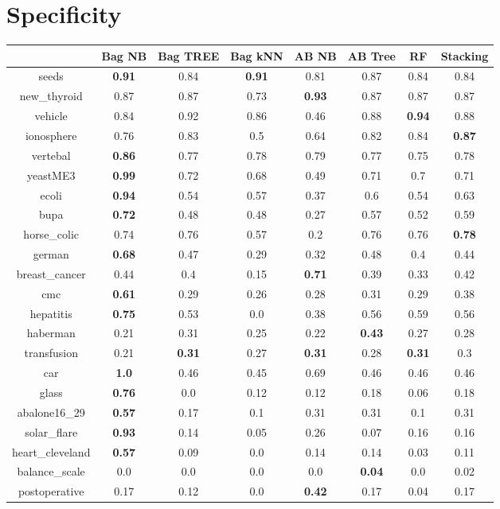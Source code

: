 \documentclass{article}%
\begin{document}
%
\section*{Specificity}%
\begin{tabular}{c|ccccccc}%
&Bag NB&Bag TREE&Bag kNN&AB NB&AB Tree&RF&Stacking\\%
\hline%
seeds&\textbf{0.91}&0.84&\textbf{0.91}&0.81&0.87&0.84&0.84\\%
new\_thyroid&0.87&0.87&0.73&\textbf{0.93}&0.87&0.87&0.87\\%
vehicle&0.84&0.92&0.86&0.46&0.88&\textbf{0.94}&0.88\\%
ionosphere&0.76&0.83&0.5&0.64&0.82&0.84&\textbf{0.87}\\%
vertebal&\textbf{0.86}&0.77&0.78&0.79&0.77&0.75&0.78\\%
yeastME3&\textbf{0.99}&0.72&0.68&0.49&0.71&0.7&0.71\\%
ecoli&\textbf{0.94}&0.54&0.57&0.37&0.6&0.54&0.63\\%
bupa&\textbf{0.72}&0.48&0.48&0.27&0.57&0.52&0.59\\%
horse\_colic&0.74&0.76&0.57&0.2&0.76&0.76&\textbf{0.78}\\%
german&\textbf{0.68}&0.47&0.29&0.32&0.48&0.4&0.44\\%
breast\_cancer&0.44&0.4&0.15&\textbf{0.71}&0.39&0.33&0.42\\%
cmc&\textbf{0.61}&0.29&0.26&0.28&0.31&0.29&0.38\\%
hepatitis&\textbf{0.75}&0.53&0.0&0.38&0.56&0.59&0.56\\%
haberman&0.21&0.31&0.25&0.22&\textbf{0.43}&0.27&0.28\\%
transfusion&0.21&\textbf{0.31}&0.27&\textbf{0.31}&0.28&\textbf{0.31}&0.3\\%
car&\textbf{1.0}&0.46&0.45&0.69&0.46&0.46&0.46\\%
glass&\textbf{0.76}&0.0&0.12&0.12&0.18&0.06&0.18\\%
abalone16\_29&\textbf{0.57}&0.17&0.1&0.31&0.31&0.1&0.31\\%
solar\_flare&\textbf{0.93}&0.14&0.05&0.26&0.07&0.16&0.16\\%
heart\_cleveland&\textbf{0.57}&0.09&0.0&0.14&0.14&0.03&0.11\\%
balance\_scale&0.0&0.0&0.0&0.0&\textbf{0.04}&0.0&0.02\\%
postoperative&0.17&0.12&0.0&\textbf{0.42}&0.17&0.04&0.17\\%
\end{tabular}

%
\end{document}
